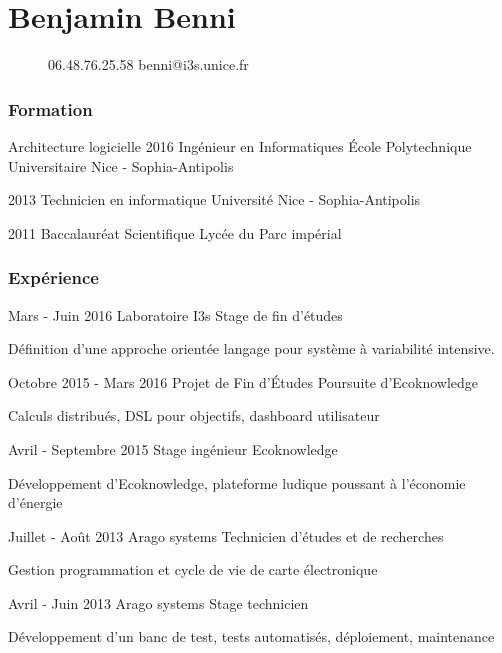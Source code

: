 \documentclass{tccv}
\begin{document}
\part{Benjamin Benni}
\begin{figure}[t]
    {06.48.76.25.58}
    {benni@i3s.unice.fr}
\end{figure}
\section{Formation}

\begin{yearlist}

\item[Architecture logicielle]{2016}
     {Ing\'enieur en Informatiques}
     {\'Ecole Polytechnique Universitaire Nice - Sophia-Antipolis}

\item{2013}
     {Technicien en informatique}
     {Universit\'e Nice - Sophia-Antipolis}

\item{2011}
     {Baccalaur\'eat Scientifique}
     {Lyc\'ee du Parc imp\'erial}

\end{yearlist}



\section{Exp\'erience}

\begin{eventlist}

\item{Mars - Juin 2016}
     {Laboratoire I3s}
     {Stage de fin d'\'etudes}

	D\'efinition d'une approche orient\'ee langage pour syst\`eme \`a variabilit\'e intensive.

\item{Octobre 2015 - Mars 2016}
     {Projet de Fin d'\'Etudes}
     {Poursuite d'Ecoknowledge}

Calculs distribu\'es, DSL pour objectifs, dashboard utilisateur

\item{Avril - Septembre 2015}
     {Stage ing\'enieur}
     {Ecoknowledge}
     
     D\'eveloppement d'Ecoknowledge, plateforme ludique poussant \`a l'\'economie d'\'energie

\item{Juillet - Ao\^ut 2013}
     {Arago systems}
     {Technicien d'\'etudes et de recherches}
     
     Gestion programmation et cycle de vie de carte \'electronique
     
 \item{Avril - Juin 2013}
     {Arago systems}
     {Stage technicien}
     
     D\'eveloppement d'un banc de test, tests automatis\'es, d\'eploiement, maintenance
     


\end{eventlist}
\end{document}
